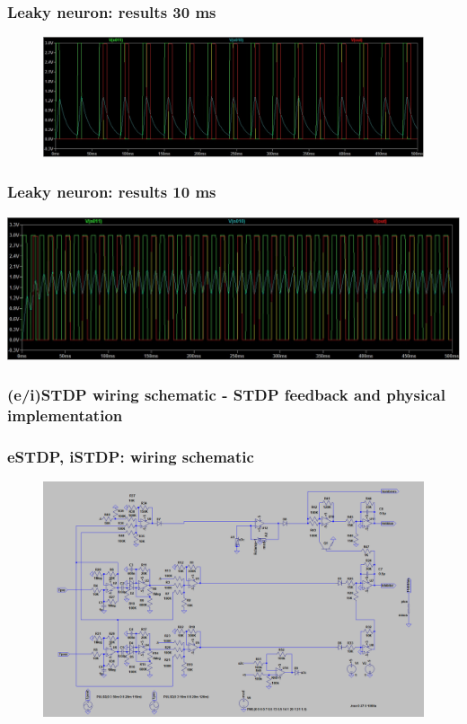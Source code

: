 \documentclass[12pt, aspectratio=169]{beamer}
\begin{document}

\begin{frame}
\frametitle{Leaky neuron: results 30 ms}
\begin{figure}
\includegraphics[width=0.85\linewidth]{30}
\end{figure}
\end{frame}


\begin{frame}
\frametitle{Leaky neuron: results 10 ms}
\centering
\includegraphics[width=0.85\linewidth]{10}
\end{frame}

\subsubsection{(e/i)STDP wiring schematic - STDP feedback and physical implementation}

\begin{frame}
\frametitle{eSTDP, iSTDP: wiring schematic}
\begin{figure}
\includegraphics[width=0.85\linewidth]{da_modulation_sch}
\end{figure}
\end{frame}
\end{document}
